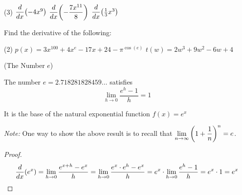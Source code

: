 \documentclass[answers]{exam}
\begin{document}
\begin{center}
\end{center}
\begin{ex*}\ 

  \begin{tasks}(3)
    \task[] $\dfrac{d}{dx}{\left(-4x^9\right)}$
    \task[] $\dfrac{d}{dx}{\left(-\dfrac{7x^{11}}{8}\right)}$
    \task[] $\dfrac{d}{dx}{\left(\frac{1}{3}x^3\right)}$
  \end{tasks}
\end{ex*}
\begin{center}
\end{center}
\begin{ex*}
  Find the derivative of the following:
  
  \begin{tasks}(2)
    \task[] $p(x)=3x^{100}+4x^e-17x+24-\pi^{\cos(e)}$
    \task[] $t(w)=2w^3+9w^2-6w+4$
  \end{tasks}
\end{ex*}
\pagebreak
\begin{defn*}(The Number $e$)

  The number $e=2.718281828459\dots$ satisfies
    $$\lim_{h\to 0} \dfrac{e^h-1}{h}=1$$

  It is the base of the natural exponential function $f(x)=e^x$
\end{defn*}
\textit{Note:} One way to show the above result is to recall that $\displaystyle\lim_{n\to \infty} {\left(1+\dfrac{1}{n}\right)}^n=e$.
\vspace*{30pt}
\begin{center}
\end{center}
\vspace*{20pt}
\begin{proof}
  $$\dfrac{d}{dx}{\left(e^x\right)}
      =\lim_{h\to 0}\dfrac{e^{x+h}-e^x}{h}
      =\lim_{h\to 0} \dfrac{e^x\cdot e^h-e^x}{h}
      =e^x\cdot\lim_{h\to 0} \dfrac{e^h-1}{h}
      =e^x\cdot 1=e^x$$
\end{proof}
\end{document}
